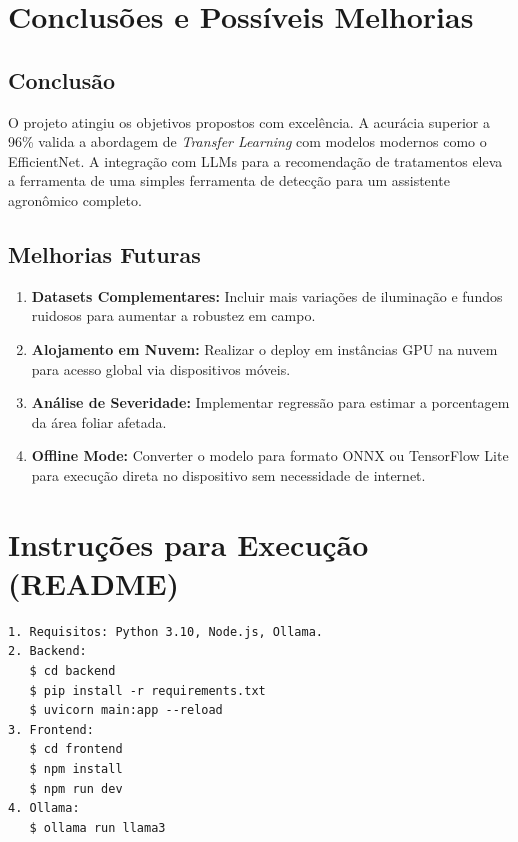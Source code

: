 \documentclass[12pt,a4paper]{article}
\begin{document}
\newpage

\section{Conclusões e Possíveis Melhorias}

\subsection{Conclusão}
O projeto atingiu os objetivos propostos com excelência. A acurácia superior a 96\% valida a abordagem de \textit{Transfer Learning} com modelos modernos como o EfficientNet. A integração com LLMs para a recomendação de tratamentos eleva a ferramenta de uma simples ferramenta de detecção para um assistente agronômico completo.

\subsection{Melhorias Futuras}
\begin{enumerate}
    \item \textbf{Datasets Complementares:} Incluir mais variações de iluminação e fundos ruidosos para aumentar a robustez em campo.
    \item \textbf{Alojamento em Nuvem:} Realizar o deploy em instâncias GPU na nuvem para acesso global via dispositivos móveis.
    \item \textbf{Análise de Severidade:} Implementar regressão para estimar a porcentagem da área foliar afetada.
    \item \textbf{Offline Mode:} Converter o modelo para formato ONNX ou TensorFlow Lite para execução direta no dispositivo sem necessidade de internet.
\end{enumerate}

\newpage

\appendix
\section{Instruções para Execução (README)}

\begin{lstlisting}[basicstyle=\ttfamily\small, breaklines=true, frame=single, title=Resumo do README.md]
1. Requisitos: Python 3.10, Node.js, Ollama.
2. Backend:
   $ cd backend
   $ pip install -r requirements.txt
   $ uvicorn main:app --reload
3. Frontend:
   $ cd frontend
   $ npm install
   $ npm run dev
4. Ollama:
   $ ollama run llama3
\end{lstlisting}
\end{document}
